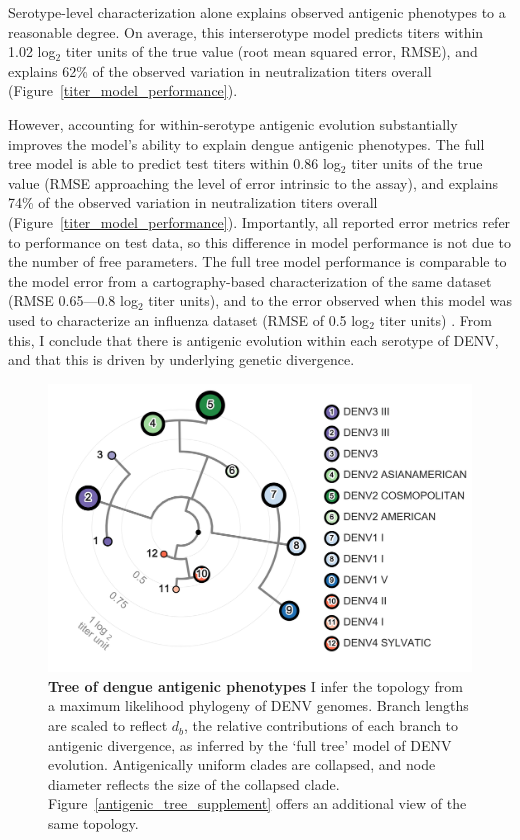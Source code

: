 Serotype-level characterization alone explains observed antigenic phenotypes to a reasonable degree.
On average, this interserotype model predicts titers within 1.02 log$_2$ titer units of the true value (root mean squared error, RMSE), and explains 62\% of the observed variation in neutralization titers overall (Figure~\ref{titer_model_performance}).

However, accounting for within-serotype antigenic evolution substantially improves the model's ability to explain dengue antigenic phenotypes.
The full tree model is able to predict test titers within 0.86 log$_2$ titer units of the true value (RMSE approaching the level of error intrinsic to the assay), and explains 74\% of the observed variation in neutralization titers overall (Figure~\ref{titer_model_performance}).
Importantly, all reported error metrics refer to performance on test data, so this difference in model performance is not due to the number of free parameters.
The full tree model performance is comparable to the model error from a cartography-based characterization of the same dataset (RMSE 0.65---0.8 log$_2$ titer units), and to the error observed when this model was used to characterize an influenza dataset (RMSE of 0.5 log$_2$ titer units) \citep{katzelnick2015dengue,neher2016prediction}.
From this, I conclude that there is antigenic evolution within each serotype of DENV, and that this is driven by underlying genetic divergence.

\begin{figure}[h!]
  \begin{centering}
    \includegraphics[width=.8\linewidth]{./png/antigenic_tree.png}
    \caption[Tree of dengue antigenic phenotypes]{\textbf{Tree of dengue antigenic phenotypes }
    I infer the topology from a maximum likelihood phylogeny of DENV genomes.
    Branch lengths are scaled to reflect $d_b$, the relative contributions of each branch to antigenic divergence, as inferred by the `full tree' model of DENV evolution.
    Antigenically uniform clades are collapsed, and node diameter reflects the size of the collapsed clade.
    Figure~\ref{antigenic_tree_supplement} offers an additional view of the same topology.
    }
     \label{antigenic_tree}
  \end{centering}
\end{figure}

